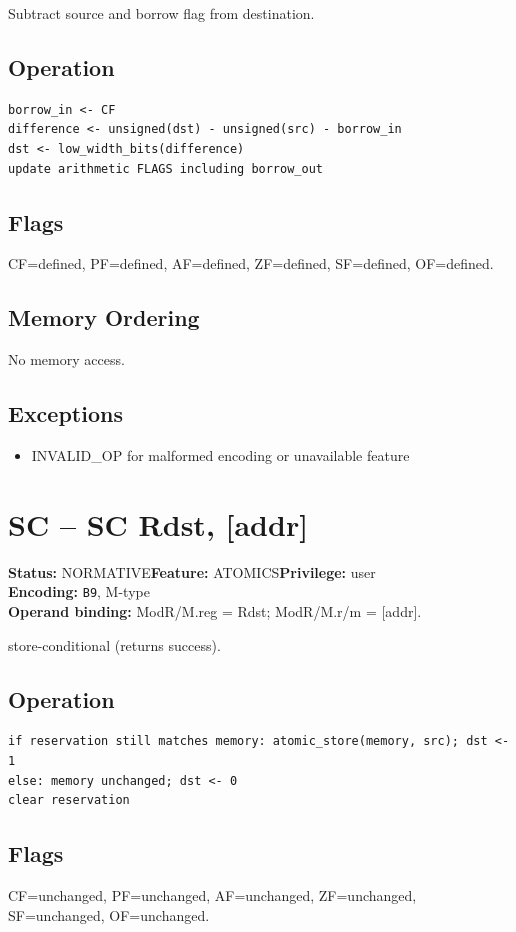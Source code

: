 \documentclass[10pt]{article}
\begin{document}
Subtract source and borrow flag from destination.

\subsection*{Operation}
\begin{lstlisting}
borrow_in <- CF
difference <- unsigned(dst) - unsigned(src) - borrow_in
dst <- low_width_bits(difference)
update arithmetic FLAGS including borrow_out
\end{lstlisting}
\subsection*{Flags}
CF=defined, PF=defined, AF=defined, ZF=defined, SF=defined, OF=defined.
\subsection*{Memory Ordering}
No memory access.
\subsection*{Exceptions}
\begin{itemize}
\item INVALID\_OP for malformed encoding or unavailable feature
\end{itemize}
\clearpage

\section{SC -- SC Rdst, [addr]}
\textbf{Status:} NORMATIVE\quad \textbf{Feature:} ATOMICS\quad \textbf{Privilege:} user\\
\textbf{Encoding:} \texttt{B9}, M-type\\
\textbf{Operand binding:} ModR/M.reg = Rdst; ModR/M.r/m = [addr].

store-conditional (returns success).

\subsection*{Operation}
\begin{lstlisting}
if reservation still matches memory: atomic_store(memory, src); dst <- 1
else: memory unchanged; dst <- 0
clear reservation
\end{lstlisting}
\subsection*{Flags}
CF=unchanged, PF=unchanged, AF=unchanged, ZF=unchanged, SF=unchanged, OF=unchanged.
\end{document}
